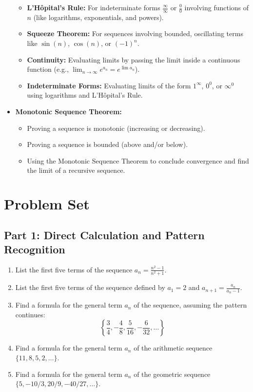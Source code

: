 \documentclass{article}
\begin{document}
\begin{itemize}
    \begin{itemize}
        \item \textbf{L'H\^opital's Rule:} For indeterminate forms $\frac{\infty}{\infty}$ or $\frac{0}{0}$ involving functions of $n$ (like logarithms, exponentials, and powers).
        \item \textbf{Squeeze Theorem:} For sequences involving bounded, oscillating terms like $\sin(n)$, $\cos(n)$, or $(-1)^n$.
        \item \textbf{Continuity:} Evaluating limits by passing the limit inside a continuous function (e.g., $\lim_{n \to \infty} e^{a_n} = e^{\lim a_n}$).
        \item \textbf{Indeterminate Forms:} Evaluating limits of the form $1^\infty$, $0^0$, or $\infty^0$ using logarithms and L'H\^opital's Rule.
    \end{itemize}
    \item \textbf{Monotonic Sequence Theorem:}
    \begin{itemize}
        \item Proving a sequence is monotonic (increasing or decreasing).
        \item Proving a sequence is bounded (above and/or below).
        \item Using the Monotonic Sequence Theorem to conclude convergence and find the limit of a recursive sequence.
    \end{itemize}
\end{itemize}

\section*{Problem Set}
\subsection*{Part 1: Direct Calculation and Pattern Recognition}

\begin{enumerate}
    \item List the first five terms of the sequence $a_n = \frac{n^2 - 1}{n^2 + 1}$.

    \item List the first five terms of the sequence defined by $a_1 = 2$ and $a_{n+1} = \frac{a_n}{a_n - 1}$.

    \item Find a formula for the general term $a_n$ of the sequence, assuming the pattern continues:
    \[ \left\{ \frac{3}{4}, -\frac{4}{8}, \frac{5}{16}, -\frac{6}{32}, \dots \right\} \]

    \item Find a formula for the general term $a_n$ of the arithmetic sequence $\{11, 8, 5, 2, \dots \}$.

    \item Find a formula for the general term $a_n$ of the geometric sequence $\{ 5, -10/3, 20/9, -40/27, \dots \}$.
\end{enumerate}
\end{document}
